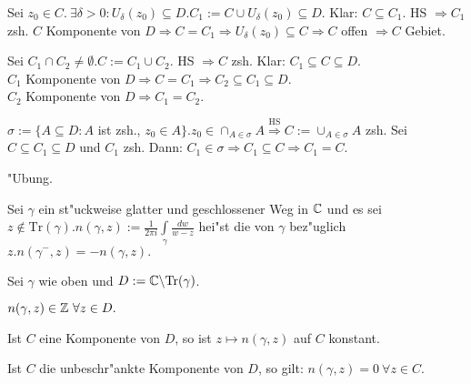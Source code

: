 \documentclass[a4paper,twoside,DIV15,BCOR12mm]{scrbook}
\def\Tr{\text{Tr}}
\def\wegint{\ensuremath{\int\limits_\gamma}}
\begin{document}
\begin{beweis}
\begin{liste}
\item Sei $z_0 \in C.\ \exists \delta > 0: U_{\delta}(z_0) \subseteq D. C_1:=C \cup U_{\delta}(z_0) \subseteq D.$ Klar: $C \subseteq C_1.$ HS $\Rightarrow C_1$ zsh. $C$ Komponente von $D \Rightarrow C=C_1 \Rightarrow U_{\delta}(z_0) \subseteq C \Rightarrow C$ offen $\Rightarrow C$ Gebiet.
\item Sei $C_1 \cap C_2 \not= \emptyset. C:=C_1 \cup C_2.$ HS $\Rightarrow C$ zsh. Klar: $C_1 \subseteq C \subseteq D$.\\
$C_1$ Komponente von $D \Rightarrow C=C_1 \Rightarrow C_2 \subseteq C_1 \subseteq D.$ \\
$C_2$ Komponente von $D \Rightarrow C_1 = C_2$.
\item $\sigma := \{ A \subseteq D: A$ ist zsh., $z_0 \in A \}. z_0 \in \cap_{A \in \sigma}A \stackrel{\mbox{HS}}{\Rightarrow} C:= \cup_{A \in \sigma} A$ zsh. Sei $C \subseteq C_1 \subseteq D$ und $C_1$ zsh. Dann: $C_1 \in \sigma \Rightarrow C_1 \subseteq C \Rightarrow C_1 = C.$
\item "Ubung.
\end{liste}
\end{beweis}

\begin{definition}
Sei $\gamma$ ein st"uckweise glatter und geschlossener Weg in $\mathbb{C}$ und es sei $z \notin \Tr(\gamma). n(\gamma,z):= \frac1{2\pi i} \wegint \frac{dw}{w-z}$ hei"st die  von $\gamma$ bez"uglich $z. n(\gamma^-,z) = -n(\gamma,z).$
\end{definition}

\begin{satz}
Sei $\gamma$ wie oben und $D:= \MdC \backslash \Tr(\gamma)$.
\begin{liste}
\item $n(\gamma,z) \in \mathbb{Z} \ \forall z \in D.$
\item Ist $C$ eine Komponente von $D$, so ist $z \mapsto n(\gamma,z)$ auf $C$ konstant.
\item Ist $C$ die unbeschr"ankte Komponente von $D$, so gilt: $n(\gamma,z) = 0 \ \forall z \in C.$
\end{liste}
\end{satz}
\end{document}

